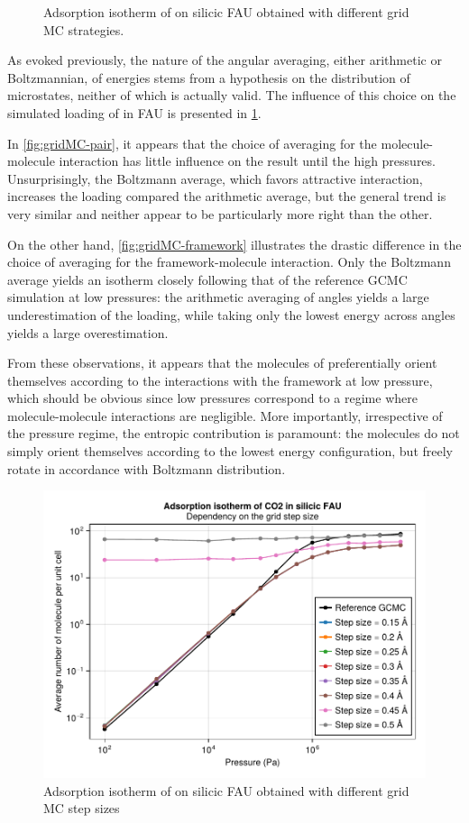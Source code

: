 \documentclass[main.tex]{subfiles}
\begin{document}
\begin{figure}
	\caption{Adsorption isotherm of  on silicic FAU obtained with different grid MC strategies.}\label{fig:gridMC-comparison}
\end{figure}


As evoked previously, the nature of the angular averaging, either arithmetic or Boltzmannian, of energies stems from a hypothesis on the distribution of microstates, neither of which is actually valid. The influence of this choice on the simulated loading of  in FAU is presented in \cref{fig:gridMC-comparison}.

In \cref{fig:gridMC-pair}, it appears that the choice of averaging for the molecule-molecule interaction has little influence on the result until the high pressures. Unsurprisingly, the Boltzmann average, which favors attractive interaction, increases the loading compared the arithmetic average, but the general trend is very similar and neither appear to be particularly more right than the other.

On the other hand, \cref{fig:gridMC-framework} illustrates the drastic difference in the choice of averaging for the framework-molecule interaction. Only the Boltzmann average yields an isotherm closely following that of the reference GCMC simulation at low pressures: the arithmetic averaging of angles yields a large underestimation of the loading, while taking only the lowest energy across angles yields a large overestimation.

From these observations, it appears that the molecules of  preferentially orient themselves according to the interactions with the framework at low pressure, which should be obvious since low pressures correspond to a regime where molecule-molecule interactions are negligible. More importantly, irrespective of the pressure regime, the entropic contribution is paramount: the molecules do not simply orient themselves according to the lowest energy configuration, but freely rotate in accordance with Boltzmann distribution.

\begin{figure}
	\centering
	\includegraphics[width=0.8\columnwidth]{figures/gcmc/gridmc_CO2_FAU_comparison_size.pdf}
	\caption{Adsorption isotherm of  on silicic FAU obtained with different grid MC step sizes}\label{fig:gridMC-sizes}
\end{figure}
\end{document}
